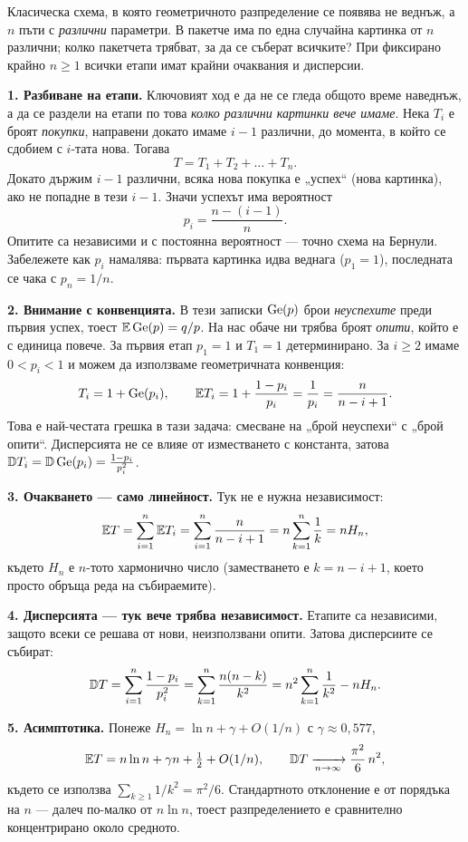 \begin{supp}\label{supp:collector}
Класическа схема, в която геометричното разпределение се появява не веднъж, а $n$ пъти с
\emph{различни} параметри. В пакетче има по една случайна картинка от $n$ различни; колко
пакетчета трябват, за да се съберат всичките?
При фиксирано крайно $n\ge1$ всички етапи имат крайни очаквания и дисперсии.

\textbf{1. Разбиване на етапи.} Ключовият ход е да не се гледа общото време наведнъж, а да
се раздели на етапи по това \emph{колко различни картинки вече имаме}. Нека $T_i$ е броят
\emph{покупки}, направени докато имаме $i-1$ различни, до момента, в който се сдобием с
$i$-тата нова. Тогава
\[ T = T_1 + T_2 + \dots + T_n . \]
Докато държим $i-1$ различни, всяка нова покупка е „успех“ (нова картинка), ако не попадне
в тези $i-1$. Значи успехът има вероятност
\[ p_i = \frac{n-(i-1)}{n} . \]
Опитите са независими и с постоянна вероятност — точно схема на Бернули. Забележете как
$p_i$ намалява: първата картинка идва веднага ($p_1 = 1$), последната се чака с
$p_n = 1/n$.

\textbf{2. Внимание с конвенцията.} В тези записки $\operatorname{Ge}(p)$ брои \emph{неуспехите} преди
първия успех, тоест $\mathbb{E} \operatorname{Ge}(p) = q/p$. На нас обаче ни трябва броят \emph{опити}, който е
с единица повече. За първия етап $p_1=1$ и $T_1=1$ детерминирано. За $i\ge2$ имаме
$0<p_i<1$ и можем да използваме геометричната конвенция:
\[ T_i = 1 + \operatorname{Ge}(p_i), \qquad \mathbb{E} T_i = 1 + \frac{1-p_i}{p_i} = \frac{1}{p_i} = \frac{n}{n-i+1} . \]
Това е най-честата грешка в тази задача: смесване на „брой неуспехи“ с „брой опити“.
Дисперсията не се влияе от изместването с константа, затова
$\mathbb{D} T_i = \mathbb{D} \operatorname{Ge}(p_i) = \frac{1-p_i}{p_i^2}$.

\textbf{3. Очакването — само линейност.} Тук не е нужна независимост:
\[
  \mathbb{E} T = \sum_{i=1}^{n} \mathbb{E} T_i = \sum_{i=1}^{n} \frac{n}{n-i+1}
       = n \sum_{k=1}^{n} \frac{1}{k} = n H_n ,
\]
където $H_n$ е $n$-тото хармонично число (заместването е $k = n-i+1$, което просто обръща
реда на събираемите).

\textbf{4. Дисперсията — тук вече трябва независимост.} Етапите са независими, защото всеки
се решава от нови, неизползвани опити. Затова дисперсиите се събират:
\[
  \mathbb{D} T = \sum_{i=1}^{n} \frac{1-p_i}{p_i^2}
         = \sum_{k=1}^{n} \frac{n(n-k)}{k^2}
         = n^2 \sum_{k=1}^{n} \frac{1}{k^2} - n H_n .
\]

\textbf{5. Асимптотика.} Понеже $H_n = \ln n + \gamma + O(1/n)$ с $\gamma \approx 0{,}577$,
\[ \mathbb{E} T = n\ln n + \gamma n + \tfrac12 + O(1/n), \qquad
   \mathbb{D} T \xrightarrow[n\to\infty]{} \frac{\pi^2}{6}\,n^2 , \]
където се използва $\sum_{k \ge 1} 1/k^2 = \pi^2/6$. Стандартното отклонение е от порядъка
на $n$ — далеч по-малко от $n \ln n$, тоест разпределението е сравнително концентрирано
около средното.


\end{supp}
